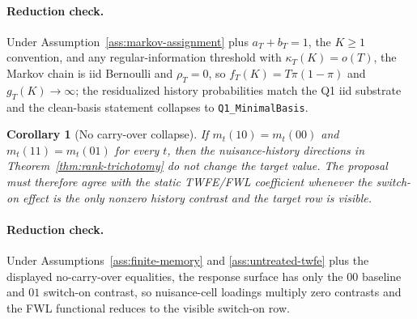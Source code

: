\documentclass[11pt]{article}
\theoremstyle{definition}
\theoremstyle{plain}
\newtheorem{corollary}{Corollary}
\theoremstyle{remark}
\begin{document}
\paragraph{Reduction check.}
Under Assumption~\ref{ass:markov-assignment} plus \(a_T+b_T=1\), the \(K\ge1\) convention, and any regular-information threshold with \(\kappa_T(K)=o(T)\), the Markov chain is iid Bernoulli and \(\rho_T=0\), so \(f_T(K)=T\pi(1-\pi)\) and \(g_T(K)\to\infty\); the residualized history probabilities match the Q1 iid substrate and the clean-basis statement collapses to \texttt{Q1\_MinimalBasis}.

\begin{corollary}[No carry-over collapse]\label{cor:no-carryover}
If \(m_t(10)=m_t(00)\) and \(m_t(11)=m_t(01)\) for every \(t\), then the nuisance-history directions in Theorem~\ref{thm:rank-trichotomy} do not change the target value.
The proposal must therefore agree with the static TWFE/FWL coefficient whenever the switch-on effect is the only nonzero history contrast and the target row is visible.
\end{corollary}
\paragraph{Reduction check.}
Under Assumptions~\ref{ass:finite-memory} and \ref{ass:untreated-twfe} plus the displayed no-carry-over equalities, the response surface has only the \(00\) baseline and \(01\) switch-on contrast, so nuisance-cell loadings multiply zero contrasts and the FWL functional reduces to the visible switch-on row.
\end{document}
